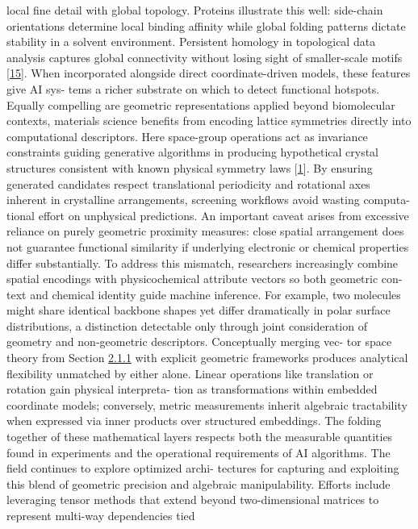 \documentclass[
]{article}
\begin{document}
local fine detail with global topology. Proteins illustrate this well:
side-chain orientations determine local binding affinity while global
folding patterns dictate stability in a solvent environment. Persistent
homology in topological data analysis captures global connectivity
without losing sight of smaller-scale motifs
{[}\hyperref[_bookmark55]{15}{]}. When incorporated alongside direct
coordinate-driven models, these features give AI sys- tems a richer
substrate on which to detect functional hotspots. Equally compelling are
geometric representations applied beyond biomolecular contexts,
materials science benefits from encoding lattice symmetries directly
into computational descriptors. Here space-group operations act as
invariance constraints guiding generative algorithms in producing
hypothetical crystal structures consistent with known physical symmetry
laws {[}\hyperref[_bookmark41]{1}{]}. By ensuring generated candidates
respect translational periodicity and rotational axes inherent in
crystalline arrangements, screening workflows avoid wasting computa-
tional effort on unphysical predictions. An important caveat arises from
excessive reliance on purely geometric proximity measures: close spatial
arrangement does not guarantee functional similarity if underlying
electronic or chemical properties differ substantially. To address this
mismatch, researchers increasingly combine spatial encodings with
physicochemical attribute vectors so both geometric con- text and
chemical identity guide machine inference. For example, two molecules
might share identical backbone shapes yet differ dramatically in polar
surface distributions, a distinction detectable only through joint
consideration of geometry and non-geometric descriptors. Conceptually
merging vec- tor space theory from Section
\hyperref[vector-spaces-and-linear-algebra]{2.1.1} with explicit
geometric frameworks produces analytical flexibility unmatched by either
alone. Linear operations like translation or rotation gain physical
interpreta- tion as transformations within embedded coordinate models;
conversely, metric measurements inherit algebraic tractability when
expressed via inner products over structured embeddings. The folding
together of these mathematical layers respects both the measurable
quantities found in experiments and the operational requirements of AI
algorithms. The field continues to explore optimized archi- tectures for
capturing and exploiting this blend of geometric precision and algebraic
manipulability. Efforts include leveraging tensor methods that extend
beyond two-dimensional matrices to represent multi-way dependencies tied
\end{document}

